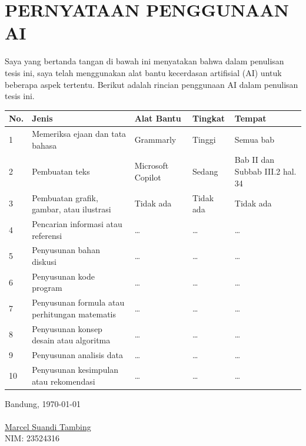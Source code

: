 \chapter*{PERNYATAAN PENGGUNAAN AI}
Saya yang bertanda tangan di bawah ini menyatakan bahwa dalam penulisan tesis ini, saya telah menggunakan alat bantu kecerdasan artifisial (AI) untuk beberapa aspek tertentu. Berikut adalah rincian penggunaan AI dalam penulisan tesis ini.
\begin{table}[h]
\begin{tabular}{|p{0.5cm}| p{4cm} | p{2.5cm} | p{2.5cm} | p{3cm} @{}| }
\hline
\textbf{No.} & \textbf{Jenis} & \textbf{Alat Bantu} & \textbf{Tingkat} & \textbf{Tempat}\\
\hline
1 & Memeriksa ejaan dan tata bahasa & Grammarly & Tinggi & Semua bab \\
\hline
2 & Pembuatan teks & Microsoft Copilot & Sedang & Bab II dan Subbab III.2 hal. 34 \\
\hline
3 & Pembuatan grafik, gambar, atau ilustrasi & Tidak ada & Tidak ada & Tidak ada \\
\hline
4 & Pencarian informasi atau referensi & \ldots & \ldots & \ldots \\
\hline
5 & Penyusunan bahan diskusi & \ldots & \ldots & \ldots \\
\hline
6 & Penyusunan kode program & \ldots & \ldots & \ldots \\
\hline
7 & Penyusunan formula atau perhitungan matematis & \ldots & \ldots & \ldots \\
\hline
8 & Penyusunan konsep desain atau algoritma & \ldots & \ldots & \ldots \\
\hline
9 & Penyusunan analisis data & \ldots & \ldots & \ldots \\
\hline
10 & Penyusunan kesimpulan atau rekomendasi & \ldots & \ldots & \ldots \\
\hline
\end{tabular}
\end{table}


Bandung, \today\\
\\[2cm]

\underline{Marcel Suandi Tambing} \\
NIM: 23524316